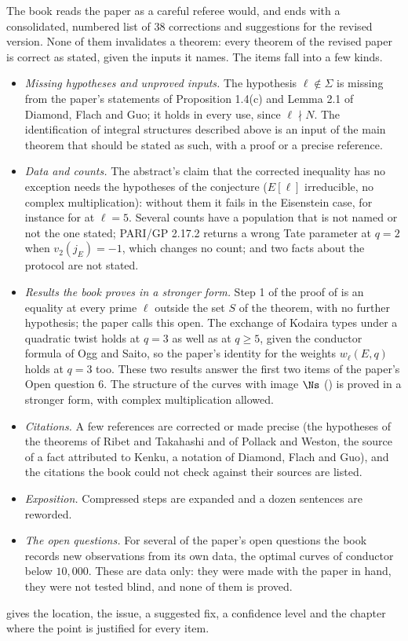 The book reads the paper as a careful referee would, and  ends with a consolidated,
numbered list of $38$ corrections and suggestions for the revised version. None of them
invalidates a theorem: every theorem of the revised paper is correct as stated, given the inputs
it names. The items fall into a few kinds.
\begin{itemize}
\item \emph{Missing hypotheses and unproved inputs.} The hypothesis $\ell\notin\Sigma$ is missing
from the paper's statements of Proposition 1.4(c) and Lemma 2.1 of Diamond, Flach and Guo; it holds
in every use, since $\ell\nmid N$. The identification of integral structures described above is an
input of the main theorem that should be stated as such, with a proof or a precise reference.
\item \emph{Data and counts.} The abstract's claim that the corrected inequality has no exception
needs the hypotheses of the conjecture ($E[\ell]$ irreducible, no complex multiplication): without
them it fails in the Eisenstein case, for instance for  at $\ell=5$. Several counts
have a population that is not named or not the one stated; PARI/GP 2.17.2 returns a wrong Tate
parameter at $q=2$ when $v_2(j_E)=-1$, which changes no count; and two facts about the protocol are not
stated.
\item \emph{Results the book proves in a stronger form.} Step 1 of the proof of
 is an equality at every prime $\ell$ outside the set $S$ of the
theorem, with no further hypothesis; the paper calls this open. The exchange of Kodaira types under
a quadratic twist holds at $q=3$ as well as at $q\ge5$, given the conductor formula of Ogg and
Saito, so the paper's identity for the weights $w_\ell(E,q)$ holds at $q=3$ too. These two results
answer the first two items of the paper's Open question 6. The structure of the curves with image
$\Ns$ () is proved in a stronger form, with complex
multiplication allowed.
\item \emph{Citations.} A few references are corrected or made precise (the hypotheses of the
theorems of Ribet and Takahashi and of Pollack and Weston, the source of a fact attributed to
Kenku, a notation of Diamond, Flach and Guo), and the citations the book could not check against
their sources are listed.
\item \emph{Exposition.} Compressed steps are expanded and a dozen sentences are reworded.
\item \emph{The open questions.} For several of the paper's open questions the book records new
observations from its own data, the optimal curves of conductor below $10{,}000$. These are data
only: they were made with the paper in hand, they were not tested blind, and none of them is
proved.
\end{itemize}
 gives the location, the issue, a suggested fix, a confidence level and the chapter
where the point is justified for every item.

